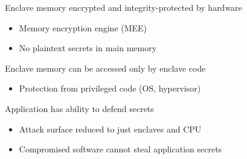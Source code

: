 Enclave memory encrypted and integrity-protected by hardware
\begin{itemize}
   \item Memory encryption engine (MEE)
   \item No plaintext secrets in main memory
\end{itemize}

Enclave memory can be accessed only by enclave code
\begin{itemize}
   \item Protection from privileged code (OS, hypervisor)
\end{itemize}

Application has ability to defend secrets
\begin{itemize}
   \item Attack surface reduced to just enclaves and CPU
   \item Compromised software cannot steal application secrets
\end{itemize}

